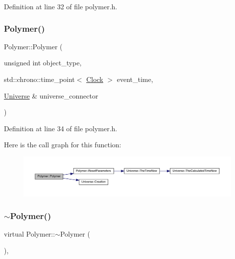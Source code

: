 Definition at line 32 of file polymer.\+h.

\mbox{\label{class_polymer_a53797e297c95b3bd934e1b8dd8c0c399}} 
\subsubsection{\texorpdfstring{Polymer()}{Polymer()}\hspace{0.1cm}{\footnotesize\ttfamily [13/14]}}
{\footnotesize\ttfamily Polymer\+::\+Polymer (\begin{DoxyParamCaption}\item[{unsigned int}]{object\+\_\+type,  }\item[{std\+::chrono\+::time\+\_\+point$<$ \hyperlink{universe_8h_a0ef8d951d1ca5ab3cfaf7ab4c7a6fd80}{Clock} $>$}]{event\+\_\+time,  }\item[{\hyperlink{class_universe}{Universe} \&}]{universe\+\_\+connector }\end{DoxyParamCaption})\hspace{0.3cm}{\ttfamily [inline]}}



Definition at line 34 of file polymer.\+h.

Here is the call graph for this function\+:
\nopagebreak
\begin{figure}[H]
\begin{center}
\leavevmode
\includegraphics[width=350pt]{class_polymer_a53797e297c95b3bd934e1b8dd8c0c399_cgraph}
\end{center}
\end{figure}
\mbox{\label{class_polymer_aac2b3983f375a5691c7d5ca1a79594d5}} 
\subsubsection{\texorpdfstring{$\sim$\+Polymer()}{~Polymer()}\hspace{0.1cm}{\footnotesize\ttfamily [10/11]}}
{\footnotesize\ttfamily virtual Polymer\+::$\sim$\+Polymer (\begin{DoxyParamCaption}{ }\end{DoxyParamCaption})\hspace{0.3cm}{\ttfamily [inline]}, {\ttfamily [virtual]}}

